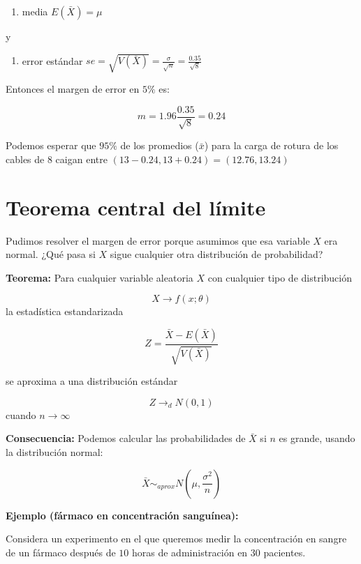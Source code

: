 \documentclass[
]{book}
\providecommand{\tightlist}{%
  \setlength{\itemsep}{0pt}\setlength{\parskip}{0pt}}
\begin{document}
\begin{enumerate}
\def\labelenumi{\arabic{enumi}.}
\tightlist
\item
  media \(E(\bar{X})=\mu\)
\end{enumerate}

y

\begin{enumerate}
\def\labelenumi{\arabic{enumi}.}
\setcounter{enumi}{1}
\tightlist
\item
  error estándar \(se=\sqrt{V(\bar{X})}=\frac{\sigma}{\sqrt{n}}=\frac{0.35}{\sqrt{8}}\)
\end{enumerate}

Entonces el margen de error en \(5\%\) es:

\[m=1.96\frac{0.35}{\sqrt{8}}=0.24\]

Podemos esperar que \(95\%\) de los promedios (\(\bar{x}\)) para la carga de rotura de los cables de \(8\) caigan entre \((13-0.24, 13+0.24)=(12.76, 13.24)\)

\hypertarget{teorema-central-del-luxedmite-1}{%
\section{Teorema central del límite}\label{teorema-central-del-luxedmite-1}}

Pudimos resolver el margen de error porque asumimos que esa variable \(X\) era normal. ¿Qué pasa si \(X\) sigue cualquier otra distribución de probabilidad?

\textbf{Teorema:} Para cualquier variable aleatoria \(X\) con cualquier tipo de distribución

\[X \rightarrow f(x; \theta)\]
la estadística estandarizada

\[Z=\frac{\bar{X}-E(\bar{X})}{\sqrt{V(\bar{X})}}\]

se aproxima a una distribución estándar

\[Z \rightarrow_d N(0,1)\] cuando \(n\rightarrow \infty\)

\textbf{Consecuencia:} Podemos calcular las probabilidades de \(\bar{X}\) si \(n\) es grande, usando la distribución normal:

\[\bar{X} \sim_{aprox} N(\mu, \frac{\sigma^2}{n})\]

\textbf{Ejemplo (fármaco en concentración sanguínea):}

Considera un experimento en el que queremos medir la concentración en sangre de un fármaco después de \(10\) horas de administración en \(30\) pacientes.
\end{document}

